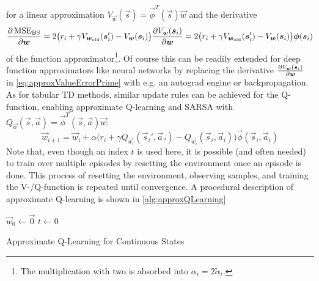 		for a linear approximation \( V_{\vec{w}}(\vec{s}) = \vec{\phi}^T(\vec{s}) \vec{w} \) and the derivative
		\begin{equation}
			\pdv{\operatorname{MSE}_\mathrm{BS}}{\bm{w}}
				= 2 \big( r_i + \gamma V_{\bm{w}_\mathrm{old}}(\bm{s}_i') - V_{\bm{w}}(\bm{s}_i) \big) \pdv{V_{\bm{w}}(\bm{s}_i)}{\bm{w}}
				= 2 \big( r_i + \gamma V_{\bm{w}_\mathrm{old}}(\bm{s}_i') - V_{\bm{w}}(\bm{s}_i) \big) \bm{\phi}(\bm{s}_i)  \label{eq:approxValueErrorPrime}
		\end{equation}
		of the function approximator\footnote{The multiplication with two is absorbed into \( \alpha_i = 2 \tilde{\alpha}_i \).}. Of course this can be readily extended for deep function approximators like neural networks by replacing the derivative \( \pdv{V_{\bm{w}}(\bm{s}_i)}{\bm{w}} \) in \eqref{eq:approxValueErrorPrime} with e.g. an autograd engine or backpropagation. As for tabular TD methods, similar update rules can be achieved for the Q-function, enabling approximate Q-learning and SARSA with \( Q_{\vec{w}}(\vec{s}, \vec{a}) = \vec{\phi}^T(\vec{s}, \vec{a}) \vec{w} \):
		\begin{equation*}
			\vec{w}_{i + 1} = \vec{w}_i + \alpha \big( r_i + \gamma Q_{\vec{w}_i}(\vec{s}_i', \vec{a}_?) - Q_{\vec{w}_i}(\vec{s}_i, \vec{a}_i) \big) \vec{\phi}(\vec{s}_i, \vec{a}_i)
		\end{equation*}
		Note that, even though an index \(t\) is used here, it is possible (and often needed) to train over multiple episodes by resetting the environment once an episode is done. This process of resetting the environment, observing samples, and training the V-/Q-function is repeated until convergence. A procedural description of approximate Q-learning is shown in \autoref{alg:approxQLearning}

		\begin{algorithm}  \DontPrintSemicolon
			\( \vec{w}_0 \gets \vec{0} \) \;
			\( t \gets 0 \) \;

			\caption{Approximate Q-Learning for Continuous States}
			\label{alg:approxQLearning}
		\end{algorithm}

